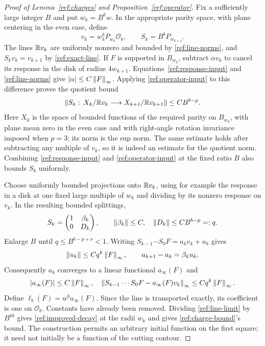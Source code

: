 \begin{proof}[Proof of Lemma~\ref{ref:charges} and
Proposition~\ref{ref:operator}]
Fix a sufficiently large integer $B$ and put $w_k=B^kw$.  In the appropriate
parity space, with plane centering in the even case, define
\[
 v_k=w_k^bP_{w_k}\mathcal O_b,
 \qquad S_k=B^bP_{w_{k+1}}.
\]
The lines $\mathbb R v_k$ are uniformly nonzero and bounded by
\eqref{ref:line-norms}, and $S_kv_k=v_{k+1}$ by
\eqref{ref:exact-line}.  If $F$ is supported in $B_{w_k}$, subtract
$\alpha v_k$ to cancel its response in the disk of radius $4w_{k+1}$.
Equations~\eqref{ref:response-input} and \eqref{ref:line-norms} give
$|\alpha|\le C\left\lVert F\right\rVert_\infty$.  Applying
\eqref{ref:operator-input} to this difference proves the quotient bound
\begin{equation}\label{ref:quotient}
 \left\lVert S_k:\,X_k/\mathbb R v_k\longrightarrow X_{k+1}/\mathbb R v_{k+1}\right\rVert
       \le CB^{b-p}.
\end{equation}
Here $X_k$ is the space of bounded functions of the required parity on
$B_{w_k}$, with plane mean zero in the even case and with right-angle
rotation invariance imposed when $p=3$; its norm is the sup norm.
The same estimate holds after subtracting any multiple of $v_k$, so it is
indeed an estimate for the quotient norm.  Combining \eqref{ref:response-input} and \eqref{ref:operator-input}
at the fixed ratio $B$ also bounds $S_k$ uniformly.

Choose uniformly bounded projections onto $\mathbb R v_k$, using for example
the response in a disk at one fixed large multiple of $w_k$ and dividing
by its nonzero response on $v_k$.  In the resulting bounded splittings,
\[
 S_k=
 \begin{pmatrix}1&\beta_k\\0&D_k\end{pmatrix},\qquad
 \left\lVert\beta_k\right\rVert\le C,\quad \left\lVert D_k\right\rVert\le CB^{b-p}=:q.
\]
Enlarge $B$ until $q\le B^{b-p+\nu}<1$.  Writing
$S_{k-1}\cdots S_0F=a_kv_k+u_k$ gives
\[
 \left\lVert u_k\right\rVert\le Cq^k\left\lVert F\right\rVert_\infty,\qquad
 a_{k+1}-a_k=\beta_ku_k.
\]
Consequently $a_k$ converges to a linear functional $a_\infty(F)$ and
\begin{equation}\label{ref:line-limit}
 |a_\infty(F)|\le C\left\lVert F\right\rVert_\infty,
 \quad
 \left\lVert S_{k-1}\cdots S_0F-a_\infty(F)v_k\right\rVert_\infty
       \le Cq^k\left\lVert F\right\rVert_\infty.
\end{equation}
Define $\ell_b(F)=w^ba_\infty(F)$.  Since the line is transported exactly,
its coefficient is one on $\mathcal O_b$.  Constants have already been
removed.  Dividing \eqref{ref:line-limit} by $B^{kb}$ gives
\eqref{ref:improved-decay} at the radii $w_k$ and gives
\eqref{ref:charge-bound}'s bound.  The construction permits an arbitrary
initial function on the first square; it need not initially be a function
of the cutting contour.


\end{proof}

